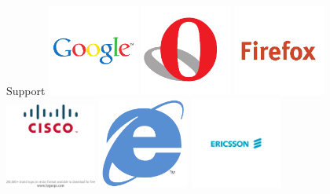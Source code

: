 \documentclass[first=red,second=purple,logo=yellowexc]{aaltoslides}
\begin{document}
\begin{frame}{Support}
\includegraphics[width=3cm]{Google-eps-converted-to.pdf}\hspace{10pt}
\includegraphics[width=3cm]{Opera-eps-converted-to.pdf}\hspace{10pt}
\includegraphics[width=3cm]{Mozilla_Firefox-eps-converted-to.pdf}\\[0.2cm]
\includegraphics[trim=0cm 5cm 0cm 0cm, clip=true, width=3cm]{cisco-logo-eps-converted-to.pdf}\hspace{10pt}
\includegraphics[width=3cm]{Internet_Explorer_4-eps-converted-to.pdf}\hspace{10pt}
\includegraphics[trim=9cm 9cm 9cm 9cm, clip=true,width=3cm]{ericsson_logo-eps-converted-to.pdf}\\[0.2cm]

\end{frame}
\end{document}
